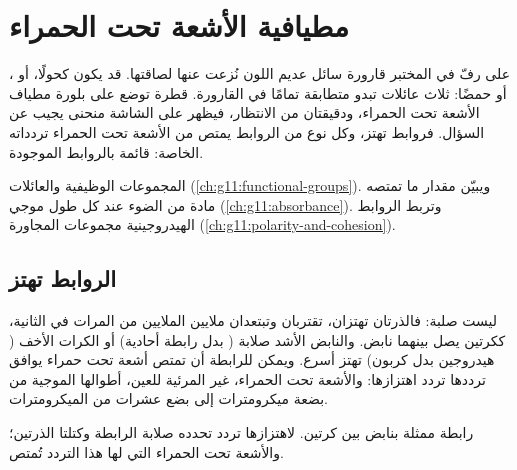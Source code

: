 \chapter{مطيافية الأشعة تحت الحمراء}\label{ch:g11:infrared}

على رفّ في المختبر قارورة سائل عديم اللون نُزعت عنها لصاقتها. قد يكون كحولًا،
أو ، أو حمضًا: ثلاث عائلات تبدو متطابقة تمامًا في القارورة. قطرة توضع
على بلورة مطياف الأشعة تحت الحمراء، ودقيقتان من الانتظار، فيظهر على الشاشة
منحنى يجيب عن السؤال. فروابط  تهتز، وكل نوع من الروابط يمتص من الأشعة
تحت الحمراء تردداته الخاصة:  قائمة بالروابط الموجودة.

\begin{recall}
المجموعات الوظيفية والعائلات (\cref{ch:g11:functional-groups}). ويبيّن  مقدار ما تمتصه مادة من الضوء عند كل طول موجي
(\cref{ch:g11:absorbance}). وتربط الروابط الهيدروجينية مجموعات 
 المجاورة (\cref{ch:g11:polarity-and-cohesion}).
\end{recall}

\section{الروابط تهتز}

 ليست صلبة: فالذرتان تهتزان، تقتربان وتبتعدان ملايين
الملايين من المرات في الثانية، ككرتين يصل بينهما نابض. والنابض الأشد صلابة
( بدل رابطة أحادية) أو الكرات الأخف ( هيدروجين بدل  كربون)
تهتز أسرع. ويمكن للرابطة أن تمتص أشعة تحت حمراء يوافق ترددها تردد اهتزازها:
والأشعة تحت الحمراء، غير المرئية للعين، أطوالها الموجية من بضعة ميكرومترات
إلى بضع عشرات من الميكرومترات.

\begin{omfigure}

{\small رابطة ممثلة بنابض بين كرتين. لاهتزازها تردد تحدده صلابة الرابطة
وكتلتا الذرتين؛ والأشعة تحت الحمراء التي لها هذا التردد تُمتص.}
\end{omfigure}

